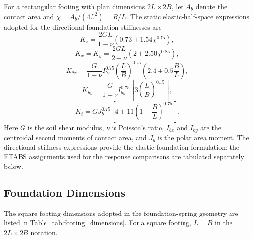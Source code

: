 For a rectangular footing with plan dimensions $2L\times2B$, let $A_b$ denote the contact area and $\chi=A_b/(4L^2)=B/L$. The static elastic-half-space expressions adopted for the directional foundation stiffnesses are~\cite{gazetas1991}
\begin{equation}
K_z = \frac{2GL}{1-\nu}\left(0.73+1.54\chi^{0.75}\right),\label{eq:gazetas_kz}
\end{equation}
\begin{equation}
K_x=K_y = \frac{2GL}{2-\nu}\left(2+2.50\chi^{0.85}\right),\label{eq:gazetas_kxy}
\end{equation}
\begin{equation}
K_{\theta x} = \frac{G}{1-\nu}I_{bx}^{0.75}\left(\frac{L}{B}\right)^{0.25}\left(2.4+0.5\frac{B}{L}\right),\label{eq:gazetas_krx}
\end{equation}
\begin{equation}
K_{\theta y} = \frac{G}{1-\nu}I_{by}^{0.75}\left[3\left(\frac{L}{B}\right)^{0.15}\right],\label{eq:gazetas_kry}
\end{equation}
\begin{equation}
K_t = GJ_b^{0.75}\left[4+11\left(1-\frac{B}{L}\right)^{0.75}\right].\label{eq:gazetas_kt}
\end{equation}
Here $G$ is the soil shear modulus, $\nu$ is Poisson's ratio, $I_{bx}$ and $I_{by}$ are the centroidal second moments of contact area, and $J_b$ is the polar area moment. The directional stiffness expressions provide the elastic foundation formulation; the ETABS assignments used for the response comparisons are tabulated separately below.

\subsection{Foundation Dimensions}
The square footing dimensions adopted in the foundation-spring geometry are listed in Table~\ref{tab:footing_dimensions}. For a square footing, $L=B$ in the $2L\times2B$ notation.

